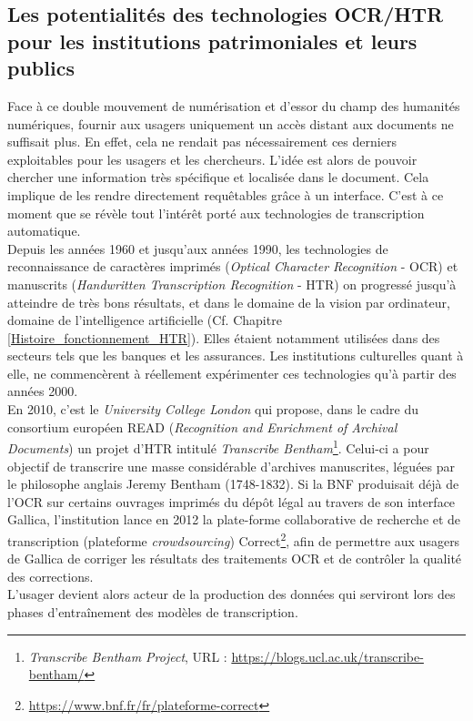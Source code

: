 \subsection{Les potentialités des technologies OCR/HTR pour les institutions patrimoniales et leurs publics} 

Face à ce double mouvement de numérisation et d'essor du champ des humanités numériques, fournir aux usagers uniquement un accès distant aux documents ne suffisait plus. En effet, cela ne rendait pas nécessairement ces derniers exploitables pour les usagers et les chercheurs. L'idée est alors de pouvoir chercher une information très spécifique et localisée dans le document. Cela implique de les rendre directement requêtables grâce à un interface. C'est à ce moment que se révèle tout l'intérêt porté aux technologies de transcription automatique.\\ 

Depuis les années 1960 et jusqu'aux années 1990, les technologies de reconnaissance de caractères imprimés (\textit{Optical Character Recognition} - OCR) et manuscrits (\textit{Handwritten Transcription Recognition} - HTR) on progressé jusqu'à atteindre de très bons résultats, et dans le domaine de la vision par ordinateur, domaine de l'intelligence artificielle (Cf. Chapitre \ref{Histoire_fonctionnement_HTR}). Elles étaient notamment utilisées dans des secteurs tels que les banques et les assurances. Les institutions culturelles quant à elle, ne commencèrent à réellement expérimenter ces technologies qu'à partir des années 2000. \\

En 2010, c'est le \textit{University College London} qui propose, dans le cadre du consortium européen READ (\textit{Recognition and Enrichment of Archival Documents}) un projet d'HTR intitulé \textit{Transcribe Bentham}\footnote{\textit{Transcribe Bentham Project}, URL : \url{https://blogs.ucl.ac.uk/transcribe-bentham/}}. Celui-ci a pour objectif de transcrire une masse considérable d'archives manuscrites, léguées par le philosophe anglais Jeremy Bentham (1748-1832). Si la BNF produisait déjà de l'OCR sur certains ouvrages imprimés du dépôt légal au travers de son interface Gallica, l'institution lance en 2012 la plate-forme collaborative de recherche et de transcription (plateforme \textit{crowdsourcing}) Correct\footnote{\url{https://www.bnf.fr/fr/plateforme-correct}}, afin de permettre aux usagers de Gallica de corriger les résultats des traitements OCR et de contrôler la qualité des corrections. \\ L'usager devient alors acteur de la production des données qui serviront lors des phases d'entraînement des modèles de transcription.

